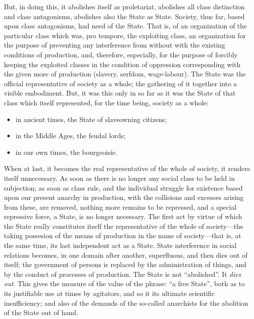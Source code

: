 But, in doing this, it abolishes itself as proletariat, abolishes all class
distinction and class antagonisms, abolishes also the State as State. Society,
thus far, based upon class antagonisms, had need of the State. That is, of an
organization of the particular class which was, pro tempore, the exploiting
class, an organization for the purpose of preventing any interference from
without with the existing conditions of production, and, therefore, especially,
for the purpose of forcibly keeping the exploited classes in the condition of
oppression corresponding with the given more of production (slavery, serfdom,
wage-labour). The State was the official representative of society as a whole;
the gathering of it together into a visible embodiment. But, it was this only in
so far as it was the State of that class which itself represented, for the time
being, society as a whole:
%
\begin{itemize}
  \item{in ancient times, the State of slaveowning citizens;}
  \item{in the Middle Ages, the feudal lords;}
  \item{in our own times, the bourgeoisie.}
\end{itemize}
%
When at last, it becomes the real representative of the whole of society, it
renders itself unnecessary. As soon as there is no longer any social class to be
held in subjection; as soon as class rule, and the individual struggle for
existence based upon our present anarchy in production, with the collisions and
excesses arising from these, are removed, nothing more remains to be repressed,
and a special repressive force, a State, is no longer necessary. The first act
by virtue of which the State really constitutes itself the representative of the
whole of society---the taking possesion of the means of production in the name
of society---that is, at the same time, its last independent act as a State.
State interference in social relations becomes, in one domain after another,
superfluous, and then dies out of itself; the government of persons is replaced
by the administration of things, and by the conduct of processes of production.
The State is not ``abolished''. It \emph{dies out}. This gives the measure of
the value of the phrase: ``a free State'', both as to its justifiable use at
times by agitators, and so it its ultimate scientific insufficiency; and also of
the demands of the so-called anarchists for the abolition of the State out of
hand.

